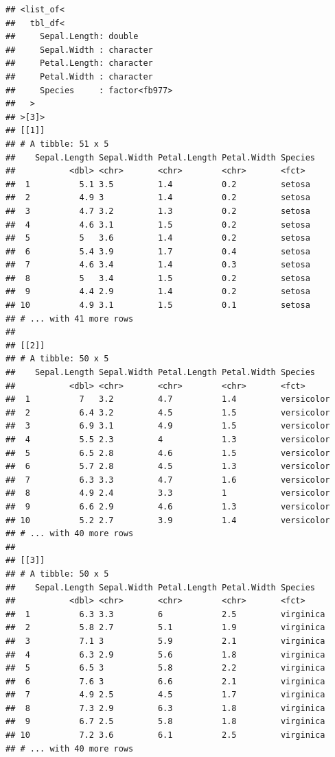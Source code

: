\documentclass[
]{book}
\begin{document}
\begin{verbatim}
## <list_of<
##   tbl_df<
##     Sepal.Length: double
##     Sepal.Width : character
##     Petal.Length: character
##     Petal.Width : character
##     Species     : factor<fb977>
##   >
## >[3]>
## [[1]]
## # A tibble: 51 x 5
##    Sepal.Length Sepal.Width Petal.Length Petal.Width Species
##           <dbl> <chr>       <chr>        <chr>       <fct>  
##  1          5.1 3.5         1.4          0.2         setosa 
##  2          4.9 3           1.4          0.2         setosa 
##  3          4.7 3.2         1.3          0.2         setosa 
##  4          4.6 3.1         1.5          0.2         setosa 
##  5          5   3.6         1.4          0.2         setosa 
##  6          5.4 3.9         1.7          0.4         setosa 
##  7          4.6 3.4         1.4          0.3         setosa 
##  8          5   3.4         1.5          0.2         setosa 
##  9          4.4 2.9         1.4          0.2         setosa 
## 10          4.9 3.1         1.5          0.1         setosa 
## # ... with 41 more rows
## 
## [[2]]
## # A tibble: 50 x 5
##    Sepal.Length Sepal.Width Petal.Length Petal.Width Species   
##           <dbl> <chr>       <chr>        <chr>       <fct>     
##  1          7   3.2         4.7          1.4         versicolor
##  2          6.4 3.2         4.5          1.5         versicolor
##  3          6.9 3.1         4.9          1.5         versicolor
##  4          5.5 2.3         4            1.3         versicolor
##  5          6.5 2.8         4.6          1.5         versicolor
##  6          5.7 2.8         4.5          1.3         versicolor
##  7          6.3 3.3         4.7          1.6         versicolor
##  8          4.9 2.4         3.3          1           versicolor
##  9          6.6 2.9         4.6          1.3         versicolor
## 10          5.2 2.7         3.9          1.4         versicolor
## # ... with 40 more rows
## 
## [[3]]
## # A tibble: 50 x 5
##    Sepal.Length Sepal.Width Petal.Length Petal.Width Species  
##           <dbl> <chr>       <chr>        <chr>       <fct>    
##  1          6.3 3.3         6            2.5         virginica
##  2          5.8 2.7         5.1          1.9         virginica
##  3          7.1 3           5.9          2.1         virginica
##  4          6.3 2.9         5.6          1.8         virginica
##  5          6.5 3           5.8          2.2         virginica
##  6          7.6 3           6.6          2.1         virginica
##  7          4.9 2.5         4.5          1.7         virginica
##  8          7.3 2.9         6.3          1.8         virginica
##  9          6.7 2.5         5.8          1.8         virginica
## 10          7.2 3.6         6.1          2.5         virginica
## # ... with 40 more rows
\end{verbatim}
\end{document}
